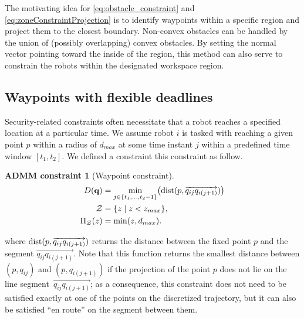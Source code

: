 \documentclass[journal]{IEEEtran}  %
\newtheorem{constraint}{ADMM constraint}
\def\sZ{\mathcal{Z}}
\begin{document}
The motivating idea for \eqref{eq:obstacle_constraint} and \eqref{eq:zoneConstraintProjection} is to identify waypoints within a specific region and project them to the closest boundary. Non-convex obstacles can be handled by the union of (possibly overlapping) convex obstacles. By setting the normal vector pointing toward the inside of the region, this method can also serve to constrain the robots within the designated workspace region.

\subsection{Waypoints with flexible deadlines}\label{sec:waypoint-constraint}
Security-related constraints often necessitate that a robot reaches a specified location at a particular time. We assume robot $i$ is tasked with reaching a given point $p$ within a radius of $d_{max}$ at some time instant $j$ within a predefined time window $[t_1,t_2]$. We defined a constraint this constraint as follow.

\begin{constraint}[Waypoint constraint]
\begin{align}
     	D(\vq) &= \min_{j\in\{t_1,\dots,t_2-1\}}\bigl(\dist(p,\overrightarrow{q_{ij}q_{i(j+1)}})\bigr)\\
\label{eq:waypoint_constraint}
  \sZ &= \{z \mid z < z_{max} \},\\
   \Pi_\sZ(z) & = \min(z, d_{max}).
\end{align}
\end{constraint}

where $\operatorname{dist}(p,\overrightarrow{q_{ij}q_{i(j+1)}})$ returns the distance between the fixed point $p$ and the segment $\overrightarrow{q_{ij}q_{i(j+1)}}$. Note that this function returns the smallest distance between $(p,q_{ij})$ and $(p,q_{i(j+1)})$ if the projection of the point $p$ does not lie on the line segment~$\overrightarrow{q_{ij}q_{i(j+1)}}$; as a consequence, this constraint does not need to be satisfied exactly at one of the points on the discretized trajectory, but it can also be satisfied ``en route'' on the segment between them.

\end{document}
